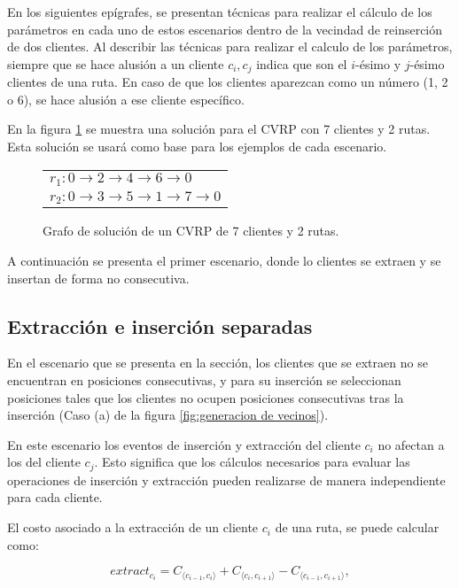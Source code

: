 \documentclass[12pt]{report}
\begin{document}
	En los siguientes epígrafes, se presentan técnicas para realizar el cálculo de los parámetros en cada uno de estos escenarios dentro de la vecindad de reinserción de dos clientes. Al describir las técnicas para realizar el calculo de los parámetros, siempre que se hace alusión a un cliente $c_i, c_j$ indica que son el $i$-ésimo y $j$-ésimo clientes de una ruta. En caso de que los clientes aparezcan como un número (1, 2 o 6), se hace alusión a ese cliente específico.

En la figura \ref{fig:Scenaries solution} se muestra una solución para el CVRP con 7 clientes y 2 rutas. Esta solución se usará como base para los ejemplos de cada escenario.

	\begin{figure}[!h]
		\centering
		\begin{tabular}{l}
			$r_1:0 \rightarrow 2 \rightarrow 4 \rightarrow 6 \rightarrow 0$ \\
			$r_2:0 \rightarrow 3 \rightarrow 5 \rightarrow 1 \rightarrow 7 \rightarrow 0$ \\
		\end{tabular}
		\caption{Grafo de solución de un CVRP de 7 clientes y 2 rutas.}
		\label{fig:Scenaries solution}
              \end{figure}

 	A continuación se presenta el primer escenario, donde lo clientes se extraen y se insertan de forma no consecutiva.

	\subsection{Extracción e inserción separadas}
	\label{sec:Extraccion e insercion separadas}

	En el escenario que se presenta en la sección, los clientes que se extraen no se encuentran en posiciones consecutivas, y para su inserción se seleccionan posiciones tales que los clientes no ocupen posiciones consecutivas tras la inserción (Caso (a) de la figura \ref{fig:generacion de vecinos}).

	En este escenario los eventos de inserción y extracción del cliente $c_i$ no afectan a los del cliente $c_j$. Esto significa que los cálculos necesarios para evaluar las operaciones de inserción y extracción pueden realizarse de manera independiente para cada cliente.

	El costo asociado a la extracción de un cliente $c_i$ de una ruta, se puede calcular como:

	\begin{equation}
		extract_{c_i} =  C_{\langle c_{i-1},c_i \rangle} + C_{\langle c_i,c_{i+1} \rangle} - C_{\langle c_{i-1}, c_{i+1} \rangle},
		\label{eq:Extract-1-client}
	\end{equation}
\end{document}
